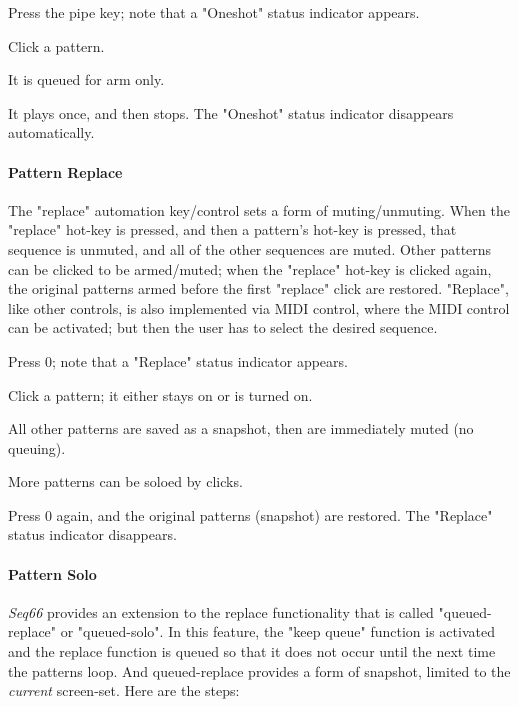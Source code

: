    \begin{enumber}
      \item Press the pipe key; note that a "Oneshot" status indicator appears.
      \item Click a pattern.
      \item It is queued for arm only.
      \item It plays once, and then stops.
         The "Oneshot" status indicator disappears automatically.
   \end{enumber}

\paragraph{Pattern Replace}
\label{paragraph:patterns_pattern_replace}

   The "replace" automation key/control sets a form of muting/unmuting.
   When the "replace" hot-key is
   pressed, and then a pattern's hot-key is pressed,
   that sequence is unmuted, and all of the other sequences are muted.
   Other patterns can be clicked to be armed/muted; when the "replace" hot-key
   is clicked again, the original patterns armed before the first "replace"
   click are restored.
   "Replace", like other controls, is also implemented via MIDI control,
   where the MIDI control can be activated; but then the user has to select
   the desired sequence.  

   \begin{enumber}
      \item Press 0; note that a "Replace" status indicator appears.
      \item Click a pattern; it either stays on or is turned on.
      \item All other patterns are saved as a snapshot, then are immediately
          muted (no queuing).
      \item More patterns can be soloed by clicks.
      \item Press 0 again, and the original patterns (snapshot) are restored.
          The "Replace" status indicator disappears.
   \end{enumber}

\paragraph{Pattern Solo}
\label{paragraph:patterns_pattern_solo}

   \textsl{Seq66} provides an extension to the replace functionality
   that is called "queued-replace" or "queued-solo".
   In this feature, the "keep queue" function is activated and the
   replace function is queued so that it does not occur until the next
   time the patterns loop.
   And queued-replace provides a form of snapshot, limited to the
   \textsl{current} screen-set.
   Here are the steps:

